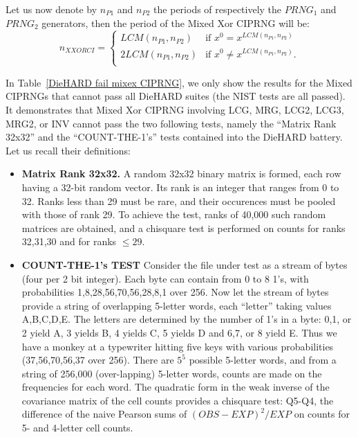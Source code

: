 Let us now denote by $n_{P1}$ and $n_{P2}$ the periods of respectively the $PRNG_1$ and $PRNG_2$ generators, then the period of the Mixed Xor CIPRNG will be:
\begin{equation}
n_{XXORCI}=
\left\{
\begin{array}{ll}
LCM(n_{P1},n_{P2})&\text{if~}x^0=x^{LCM(n_{P1},n_{P2})}\\
2LCM(n_{P1},n_{P2})&\text{if~}x^0\neq x^{LCM(n_{P1},n_{P2})}.\\
\end{array}
\right.
\label{equation Oplus}
\end{equation}

In Table~\ref{DieHARD fail mixex CIPRNG}, we only show the results for the Mixed CIPRNGs that cannot pass all DieHARD suites (the NIST tests are all passed). It demonstrates that Mixed Xor CIPRNG involving LCG, MRG, LCG2, LCG3, MRG2, or INV cannot pass the two following tests, namely the ``Matrix Rank 32x32'' and the ``COUNT-THE-1's'' tests contained into the DieHARD battery. Let us recall their definitions:

\begin{itemize}
 \item \textbf{Matrix Rank 32x32.} A random 32x32 binary matrix is formed, each row having a 32-bit random vector. Its rank is an integer that ranges from 0 to 32. Ranks less than 29 must be rare, and their occurences must be pooled with those of rank 29. To achieve the test, ranks of 40,000 such random matrices are obtained, and a chisquare test is performed on counts for ranks 32,31,30 and for ranks $\leq29$.

 \item \textbf{COUNT-THE-1's TEST} Consider the file under test as a stream of bytes (four per  2 bit integer).  Each byte can contain from 0 to 8 1's, with probabilities 1,8,28,56,70,56,28,8,1 over 256.  Now let the stream of bytes provide a string of overlapping  5-letter words, each ``letter'' taking values A,B,C,D,E. The letters are determined by the number of 1's in a byte: 0,1, or 2 yield A, 3 yields B, 4 yields C, 5 yields D and 6,7, or 8 yield E. Thus we have a monkey at a typewriter hitting five keys with various probabilities (37,56,70,56,37 over 256).  There are $5^5$ possible 5-letter words, and from a string of 256,000 (over-lapping) 5-letter words, counts are made on the frequencies for each word.   The quadratic form in the weak inverse of the covariance matrix of the cell counts provides a chisquare test: Q5-Q4, the difference of the naive Pearson sums of $(OBS-EXP)^2/EXP$ on counts for 5- and 4-letter cell counts.
\end{itemize}

